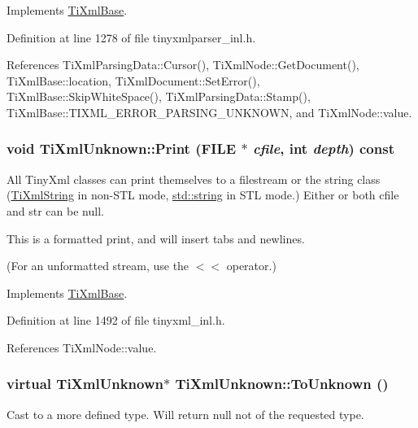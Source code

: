 Implements \hyperlink{class_ti_xml_base_a00e4edb0219d00a1379c856e5a1d2025}{TiXmlBase}.

Definition at line 1278 of file tinyxmlparser\_\-inl.h.

References TiXmlParsingData::Cursor(), TiXmlNode::GetDocument(), TiXmlBase::location, TiXmlDocument::SetError(), TiXmlBase::SkipWhiteSpace(), TiXmlParsingData::Stamp(), TiXmlBase::TIXML\_\-ERROR\_\-PARSING\_\-UNKNOWN, and TiXmlNode::value.\hypertarget{class_ti_xml_unknown_a025f19c21ef01ea9be50febb8fe0ba06}{
\subsubsection[{Print}]{\setlength{\rightskip}{0pt plus 5cm}void TiXmlUnknown::Print (FILE $\ast$ {\em cfile}, \/  int {\em depth}) const}}
\label{class_ti_xml_unknown_a025f19c21ef01ea9be50febb8fe0ba06}
All TinyXml classes can print themselves to a filestream or the string class (\hyperlink{class_ti_xml_string}{TiXmlString} in non-\/STL mode, \hyperlink{classstd_1_1string}{std::string} in STL mode.) Either or both cfile and str can be null.

This is a formatted print, and will insert tabs and newlines.

(For an unformatted stream, use the $<$$<$ operator.) 

Implements \hyperlink{class_ti_xml_base_a0de56b3f2ef14c65091a3b916437b512}{TiXmlBase}.

Definition at line 1492 of file tinyxml\_\-inl.h.

References TiXmlNode::value.\hypertarget{class_ti_xml_unknown_a67c9fd22940e8c47f706a72cdd2e332c}{
\subsubsection[{ToUnknown}]{\setlength{\rightskip}{0pt plus 5cm}virtual {\bf TiXmlUnknown}$\ast$ TiXmlUnknown::ToUnknown ()}}
\label{class_ti_xml_unknown_a67c9fd22940e8c47f706a72cdd2e332c}


Cast to a more defined type. Will return null not of the requested type. 

